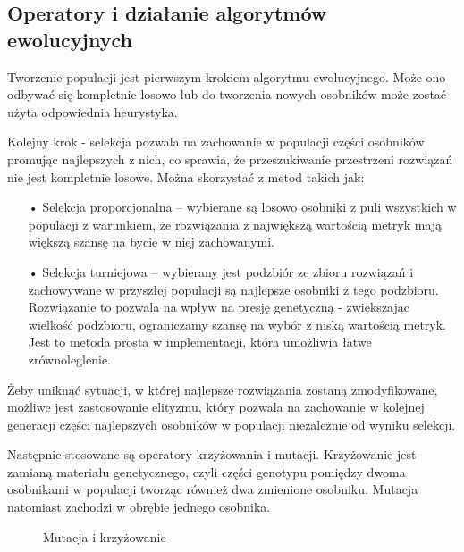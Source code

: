 \subsection{Operatory i działanie algorytmów ewolucyjnych}
Tworzenie populacji jest pierwszym krokiem algorytmu ewolucyjnego. Może ono odbywać się kompletnie losowo lub do tworzenia nowych osobników może zostać użyta odpowiednia heurystyka. 

Kolejny krok - selekcja pozwala na zachowanie w populacji części osobników promując najlepszych z nich, co sprawia, że przeszukiwanie przestrzeni rozwiązań nie jest kompletnie losowe. Można skorzystać z metod takich jak:
\begin{itemize}
  \item[•] Selekcja proporcjonalna -- wybierane są losowo osobniki z puli wszystkich w populacji z warunkiem, że rozwiązania z największą wartością metryk mają większą szansę na bycie w niej zachowanymi. 
  \item[•] Selekcja turniejowa -- wybierany jest podzbiór ze zbioru rozwiązań i zachowywane w przyszłej populacji są najlepsze osobniki z tego podzbioru. Rozwiązanie to pozwala na wpływ na presję genetyczną - zwiększając wielkość podzbioru, ograniczamy szansę na wybór z niską wartością metryk. Jest to metoda prosta w implementacji, która umożliwia łatwe zrównoleglenie.
\end{itemize}

Żeby uniknąć sytuacji, w której najlepsze rozwiązania zostaną zmodyfikowane, możliwe jest zastosowanie elityzmu, który pozwala na zachowanie w kolejnej generacji części najlepszych osobników w populacji niezależnie od wyniku selekcji.

Następnie stosowane są operatory krzyżowania i mutacji. Krzyżowanie jest zamianą materiału genetycznego, czyli części genotypu pomiędzy dwoma osobnikami w populacji tworząc również dwa zmienione osobniku. Mutacja natomiast zachodzi w obrębie jednego osobnika.

\begin{figure}[H]
	\caption{\label{fig:mutation-and-crossover-operations}Mutacja i krzyżowanie}
\end{figure}

